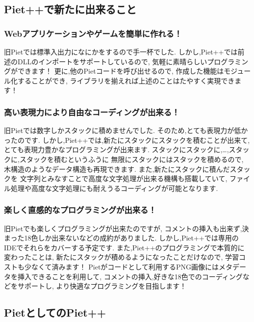 \subsection{Piet++で新たに出来ること}

\subsubsection{Webアプリケーションやゲームを簡単に作れる！}

旧Pietでは標準入出力になにかをするので手一杯でした.
しかし,Piet++では前述のDLLのインポートをサポートしているので,
気軽に素晴らしいプログラミングができます！
更に,他のPietコードを呼び出せるので,
作成した機能はモジュール化することができ,
ライブラリを揃えれば上述のことはたやすく実現できます！

\subsubsection{高い表現力により自由なコーディングが出来る！}

旧Pietでは数字しかスタックに積めませんでした.
そのため,とても表現力が低かったのです.
しかし,Piet++では,新たにスタックにスタックを積むことが出来て,
とても表現力豊かなプログラミングが出来ます.
スタックにスタックに,\ldots{},スタックに,スタックを積むというふうに
無限にスタックにはスタックを積めるので,
木構造のようなデータ構造も再現できます.
また,新たにスタックに積んだスタックを
文字列とみなすことで高度な文字処理が出来る機構も搭載していて,
ファイル処理や高度な文字処理にも耐えうるコーディングが可能となります.

\subsubsection{楽しく直感的なプログラミングが出来る！}

旧Pietでも楽しくプログラミングが出来たのですが,
コメントの挿入も出来ず,決まった18色しか出来ないなどの成約がありました.
しかし,Piet++では専用のIDEでそれらをカバーする予定です.
また,Piet++のプログラミングで本質的に変わったことは,
新たにスタックが積めるようになったことだけなので,
学習コストも少なくて済みます！
Pietがコードとして利用するPNG画像にはメタデータを挿入できることを利用して,
コメントの挿入,好きな18色でのコーディングなどをサポートし,
より快適なプログラミングを目指します！

\subsection{PietとしてのPiet++}

